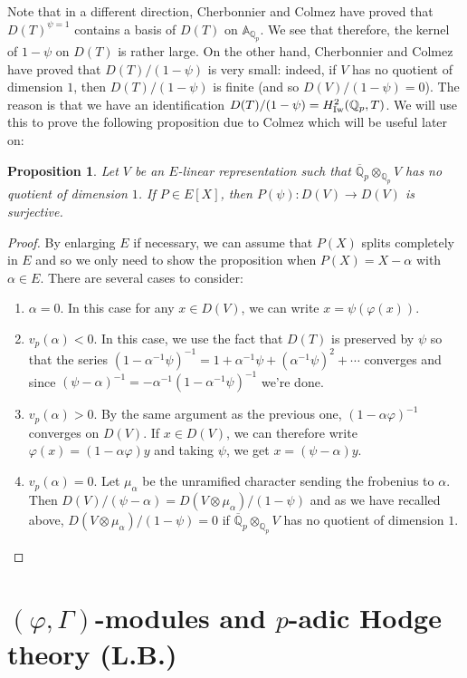 \documentclass[11pt]{amsart}
\def\Q{{\mathbb Q}_p}
\def\ra{\rightarrow}
\def\Qp{{\mathbb Q}_p}
\def\aa{\mathbb{A}}
\newtheorem{prop}[definit]{\bf{Proposition}}
\begin{document}
Note that in a different direction, Cherbonnier and 
Colmez have proved that $D(T)^{\psi=1}$ contains 
a basis of $D(T)$ on $\aa_{\Q}$. We see that therefore, the kernel of 
$1-\psi$ on $D(T)$ is rather large. On the other hand, Cherbonnier and 
Colmez have proved that $D(T)/(1-\psi)$ is very small: indeed, if $V$ 
has no quotient of dimension $1$, then $D(T)/(1-\psi)$ is finite (and 
so $D(V)/(1-\psi)=0$). The reason is that we have an identification 
$D(T)/(1-\psi) = H^2_{\rm Iw}(\Q,T)$. 
We will use this to prove the following 
proposition due to Colmez which will be useful later on: 
 
\begin{prop}\label{psisurj} 
Let $V$ be an $E$-linear representation such that  
$\overline\Qp \otimes_{\Q} V$ has no quotient of dimension $1$. If $P 
\in E[X]$, then $P(\psi) : D(V) \ra D(V)$ is surjective. 
\end{prop} 
 
\begin{proof} 
By enlarging $E$ if necessary, we can assume that $P(X)$ splits 
completely in $E$ and so we only need to show the proposition when 
$P(X)=X-\alpha$ with $\alpha \in E$. There are several cases to 
consider:  
\begin{enumerate} 
\item $\alpha=0$. In this case for any $x \in D(V)$, we can write 
  $x=\psi(\varphi(x))$.  
\item $v_p(\alpha) < 0$. In this case, we use the fact that $D(T)$ is 
  preserved by $\psi$ so that the series 
  $(1-\alpha^{-1}\psi)^{-1}=1+\alpha^{-1}\psi + (\alpha^{-1}\psi)^2 + 
  \cdots$ converges and since $(\psi-\alpha)^{-1} = - \alpha^{-1} 
  (1-\alpha^{-1}\psi)^{-1}$ we're done. 
\item $v_p(\alpha) > 0$. By the same argument as the previous one, 
  $(1-\alpha\varphi)^{-1}$ converges on $D(V)$. If $x \in D(V)$, we can 
  therefore write $\varphi(x)=(1-\alpha \varphi)y$ and taking $\psi$, we get 
  $x=(\psi-\alpha)y$.   
\item $v_p(\alpha) = 0$. Let 
  $\mu_{\alpha}$ be the unramified character sending the frobenius to 
  $\alpha$. Then $D(V)/(\psi-\alpha) = D(V \otimes 
  \mu_{\alpha})/(1-\psi)$ and as we have recalled above, $D(V \otimes 
  \mu_{\alpha})/(1-\psi)=0$ if $\overline\Qp 
  \otimes_{\Q} V$ has no quotient of dimension $1$.  
\end{enumerate} 
\end{proof} 
 
 
\section{$(\varphi,\Gamma)$-modules and $p$-adic Hodge theory (L.B.)}\label{LB4} 
 
\end{document}
